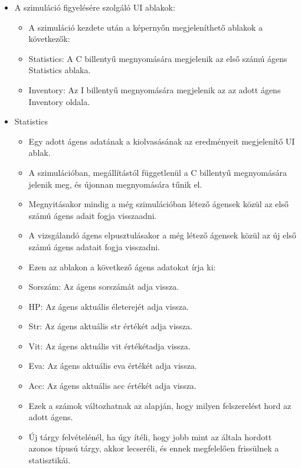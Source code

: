 \begin{itemize}
    \item A szimuláció figyelésére szolgáló UI ablakok:
    
    \begin{itemize}
        \item A szimuláció kezdete után a képernyőn megjeleníthető ablakok a következők:
        \item Statistics: A C billentyű megnyomására megjelenik az első számú ágens Statistics ablaka.
        \item Inventory: Az I billentyű megnyomására megjelenik az az adott ágens Inventory oldala.
    \end{itemize}

    \item Statistics
    
    \begin{itemize}
        \item Egy adott ágens adatának a kiolvasásának az eredményeit megjelenítő UI ablak.
        \item A szimulációban, megállítástól függetlenül a C billentyű megnyomására jelenik meg, és újonnan megnyomására tűnik el.
        \item Megnyitásakor mindig a még szimulációban létező ágensek közül az első számú ágens adait fogja visszaadni.
        \item A vizsgálandó ágens elpusztulásakor a még létező ágensek közül az új első számú ágens adatait fogja visszadni.
        \item Ezen az ablakon a következő ágens adatokat írja ki:
        \item Sorszám: Az ágens sorszámát adja vissza.
        \item HP: Az ágens aktuális életerejét adja vissza.
        \item Str: Az ágens aktuális str értékét adja vissza.
        \item Vit: Az ágens aktuális vit értékétadja vissza.
        \item Eva: Az ágens aktuális eva értékét adja vissza.
        \item Acc: Az ágens aktuális acc értékét adja vissza.
        \item Ezek a számok változhatnak az alapján, hogy milyen felszerelést hord az adott ágens.
        \item Új tárgy felvételénél, ha úgy ítéli, hogy jobb mint az általa hordott azonos típusú tárgy, akkor lecseréli, és ennek megfelelően frissülnek a statisztikái.
    \end{itemize}


\end{itemize}
